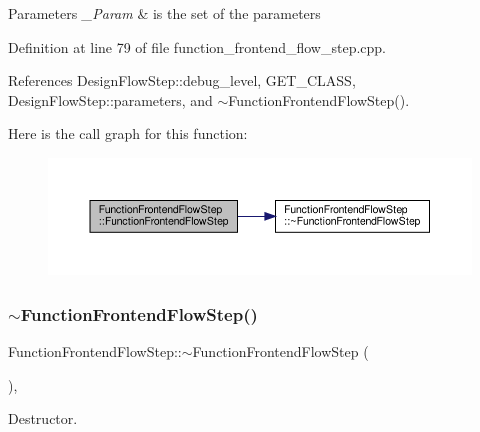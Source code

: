 \begin{DoxyParams}{Parameters}
{\em \+\_\+\+Param} & is the set of the parameters \\
\hline
\end{DoxyParams}


Definition at line 79 of file function\+\_\+frontend\+\_\+flow\+\_\+step.\+cpp.



References Design\+Flow\+Step\+::debug\+\_\+level, G\+E\+T\+\_\+\+C\+L\+A\+SS, Design\+Flow\+Step\+::parameters, and $\sim$\+Function\+Frontend\+Flow\+Step().

Here is the call graph for this function\+:
\nopagebreak
\begin{figure}[H]
\begin{center}
\leavevmode
\includegraphics[width=350pt]{d8/d0a/classFunctionFrontendFlowStep_a468b4735cbda0052511a1f9a1d02f32b_cgraph}
\end{center}
\end{figure}
\mbox{\label{classFunctionFrontendFlowStep_a98d5dace07585982ed44b425805051b3}} 
\subsubsection{\texorpdfstring{$\sim$\+Function\+Frontend\+Flow\+Step()}{~FunctionFrontendFlowStep()}}
{\footnotesize\ttfamily Function\+Frontend\+Flow\+Step\+::$\sim$\+Function\+Frontend\+Flow\+Step (\begin{DoxyParamCaption}{ }\end{DoxyParamCaption})\hspace{0.3cm}{\ttfamily [override]}, {\ttfamily [default]}}



Destructor. 




